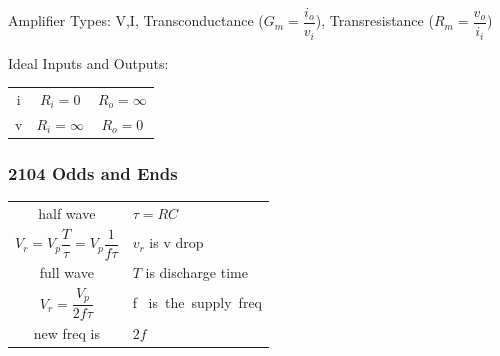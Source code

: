 Amplifier Types: V,I, Transconductance ($G_m=\dfrac{i_o}{v_i}$),
Transresistance ($R_m=\dfrac{v_o}{i_i}$)

Ideal Inputs and Outputs: 
\begin{tabular}{ccc}
i&$R_i=0$&$R_o=\infty$\\
v&$R_i=\infty$&$R_o=0$\\
\end{tabular}
\subsubsection*{2104 Odds and Ends}

\begin{tabular}{cl}
half wave&$\tau= RC$\\
$V_r = V_p \dfrac{T}{\tau} = V_p\dfrac{1}{f\tau }$&$v_r$ is v drop\\
full wave&$T$ is discharge time\\
$V_r = \dfrac{V_p}{2f\tau }$&f \mbox{ is the supply freq}\\
new freq is&$2f$\\
\end{tabular}

\vfill

